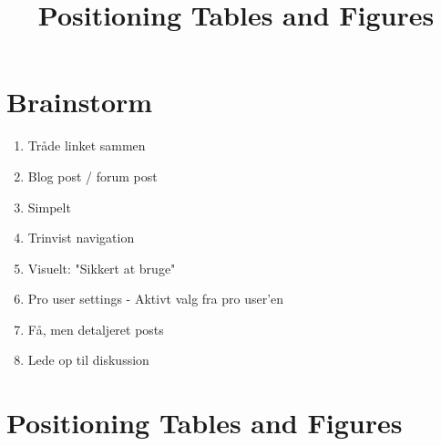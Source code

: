 \documentclass[11pt]{article}
\title{Positioning Tables and Figures}
\begin{document}
\section{Brainstorm}
\begin{enumerate}
\item Tråde linket sammen
\item Blog post / forum post
\item Simpelt
\item Trinvist navigation
\item Visuelt: "Sikkert at bruge"
\item Pro user settings - Aktivt valg fra pro user'en
\item Få, men detaljeret posts
\item Lede op til diskussion
\end{enumerate}

\newpage

\section{Positioning Tables and Figures}
\end{document}
